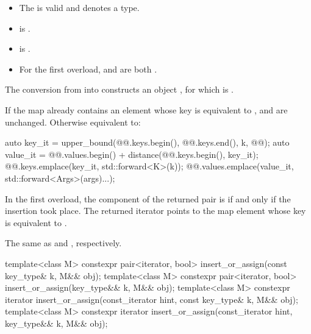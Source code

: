 \begin{itemdescr}
\pnum
\constraints
\begin{itemize}
\item
The  
is valid and denotes a type.
\item
{} is .
\item
{} is .
\item
For the first overload,
 and
 are both .
\end{itemize}

\pnum
\expects
The conversion from  into  constructs
an object ,
for which  is .

\pnum
\effects
If the map already contains an element whose key is equivalent to ,
 and  are unchanged.
Otherwise equivalent to:
\begin{codeblock}
auto key_it = upper_bound(@@.keys.begin(), @@.keys.end(), k, @@);
auto value_it = @@.values.begin() + distance(@@.keys.begin(), key_it);
@@.keys.emplace(key_it, std::forward<K>(k));
@@.values.emplace(value_it, std::forward<Args>(args)...);
\end{codeblock}

\pnum
\returns
In the first overload,
the  component of the returned pair is 
if and only if the insertion took place.
The returned iterator points to the map element
whose key is equivalent to .

\pnum
\complexity
The same as  and , respectively.
\end{itemdescr}

%
\begin{itemdecl}
template<class M>
  constexpr pair<iterator, bool> insert_or_assign(const key_type& k, M&& obj);
template<class M>
  constexpr pair<iterator, bool> insert_or_assign(key_type&& k, M&& obj);
template<class M>
  constexpr iterator insert_or_assign(const_iterator hint, const key_type& k, M&& obj);
template<class M>
  constexpr iterator insert_or_assign(const_iterator hint, key_type&& k, M&& obj);
\end{itemdecl}

